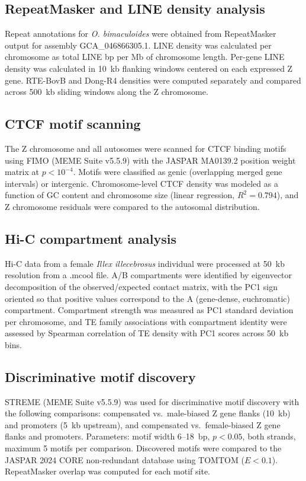 \documentclass[12pt]{article}
\newcommand{\illex}{\textit{Illex illecebrosus}\xspace}
\begin{document}
\subsection*{RepeatMasker and LINE density analysis}

Repeat annotations for \textit{O. bimaculoides}
were obtained from RepeatMasker output for assembly GCA\_046866305.1.
LINE density was calculated per chromosome as total LINE bp per Mb of chromosome length.
Per-gene LINE density was calculated in 10~kb flanking windows
centered on each expressed Z gene.
RTE-BovB and Dong-R4 densities were computed separately
and compared across 500~kb sliding windows along the Z chromosome.

\subsection*{CTCF motif scanning}

The Z chromosome and all autosomes were scanned for CTCF binding motifs
using FIMO (MEME Suite v5.5.9) with the JASPAR MA0139.2 position weight matrix
at $p < 10^{-4}$.
Motifs were classified as genic (overlapping merged gene intervals)
or intergenic.
Chromosome-level CTCF density was modeled as a function of GC content
and chromosome size (linear regression, $R^2 = 0.794$),
and Z chromosome residuals were compared to the autosomal distribution.

\subsection*{Hi-C compartment analysis}

Hi-C data from a female \illex individual were processed
at 50~kb resolution from a .mcool file.
A/B compartments were identified by eigenvector decomposition of the observed/expected
contact matrix, with the PC1 sign oriented so that positive values
correspond to the A (gene-dense, euchromatic) compartment.
Compartment strength was measured as PC1 standard deviation per chromosome,
and TE family associations with compartment identity were assessed
by Spearman correlation of TE density with PC1 scores across 50~kb bins.

\subsection*{Discriminative motif discovery}

STREME (MEME Suite v5.5.9) was used for discriminative motif discovery
with the following comparisons:
compensated vs.\ male-biased Z gene flanks (10~kb) and promoters (5~kb upstream),
and compensated vs.\ female-biased Z gene flanks and promoters.
Parameters: motif width 6--18~bp, $p < 0.05$, both strands, maximum 5 motifs per comparison.
Discovered motifs were compared to the JASPAR 2024 CORE non-redundant database
using TOMTOM ($E < 0.1$).
RepeatMasker overlap was computed for each motif site.
\end{document}
